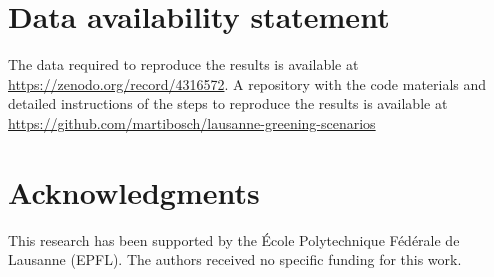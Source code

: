 \documentclass[10pt,letterpaper]{article}
\begin{document}
\section*{Data availability statement}

The data required to reproduce the results is available at \url{https://zenodo.org/record/4316572}. A repository with the code materials and detailed instructions of the steps to reproduce the results is available at \url{https://github.com/martibosch/lausanne-greening-scenarios}

\section*{Acknowledgments}
This research has been supported by the \'Ecole Polytechnique F\'ed\'erale de Lausanne (EPFL).
The authors received no specific funding for this work.

\nolinenumbers




\end{document}
